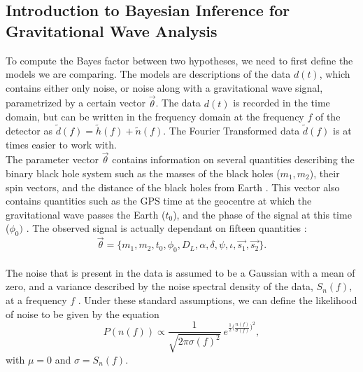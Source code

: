 \documentclass{article}
\begin{document}
 
 
 
 \subsection{Introduction to Bayesian Inference for Gravitational Wave Analysis}
 \label{section:introToBayes}
 
To compute the Bayes factor between two hypotheses, we need to first define the models we are comparing. The models are descriptions of the data $d(t)$, which contains either only noise, or noise along with a gravitational wave signal, parametrized by a certain vector $\vec{\theta}$. The data $d(t)$ is recorded in the time domain, but can be written in the frequency domain at the frequency $f$ of the detector as $\tilde{d}(f)= \tilde{h}(f)+\tilde{n}(f).$ The Fourier Transformed data $\tilde{d}(f)$ is at times easier to work with. \\






The parameter vector $\vec{\theta}$ contains information on several quantities describing the binary black hole system such as the masses of the black holes ($m_1, m_2$), their spin vectors, and the distance of the black holes from Earth \cite{BaeStats}. This vector also contains quantities such as the GPS time at the geocentre at which the gravitational wave passes the Earth ($t_0$), and the phase of the signal at this time ($\phi_0)$ \cite{BaeStats}. The observed signal is actually dependant on fifteen quantities \cite{BaeStats}:
$$\vec{\theta} = \{ m_1, m_2, t_0, \phi_0, D_L, \alpha, \delta, \psi, \iota, \vec{s_1}, \vec{s_2} \}. $$
$\text{ }$\\
 The noise that is present in the data is assumed to be a Gaussian with a mean of zero, and a variance described by the noise spectral density of the data, $S_n (f)$, at a frequency $f$ \cite{BaeStats}. Under these standard assumptions, we can define the likelihood of noise to be given by the equation
  \begin{equation} \label{eq:noise}
 P(n(f)) \propto \frac{1}{\sqrt{2 \pi \sigma(f)^2} } \ e^{\frac{1}{2} \big(\frac{n(f)}{\sigma(f)}\big)^2},
  \end{equation}
  \noindent with $\mu = 0$ and $\sigma  = S_n (f)$.\\
 
\end{document}
